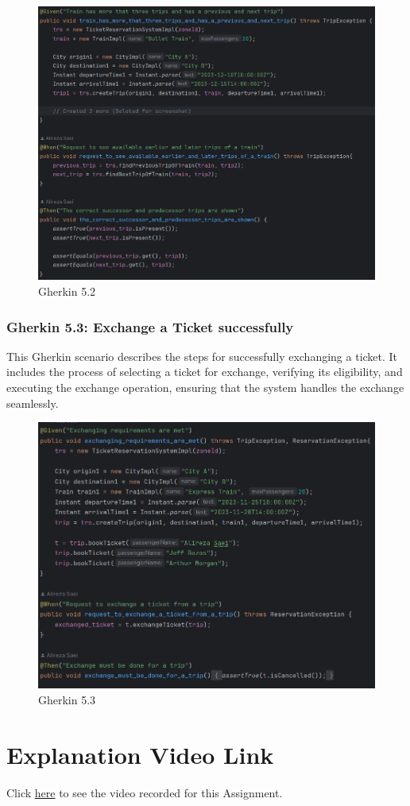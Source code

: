 \documentclass{article}
\begin{document}
\begin{figure}[h]
  \centering
  \includegraphics[width=1.0\textwidth]{pictures/T5-2.png}
  \caption{Gherkin 5.2}
  \label{fig:your_label}
\end{figure}

\pagebreak

\subsubsection{Gherkin 5.3: Exchange a Ticket successfully}

This Gherkin scenario describes the steps for successfully exchanging a ticket. It includes the process of selecting a ticket for exchange, verifying its eligibility, and executing the exchange operation, ensuring that the system handles the exchange seamlessly.

 \begin{figure}[h]
  \centering
  \includegraphics[width=1.0\textwidth]{pictures/T5-3.png}
  \caption{Gherkin 5.3}
  \label{fig:your_label}
\end{figure}

\pagebreak

\section{Explanation Video Link}

Click \href{https://drive.google.com/drive/folders/1-BSLuse4CqGO21lJPfkw_UZzK11P2siH?usp=drive_link}{here} to see the video recorded for this Assignment.
\end{document}
